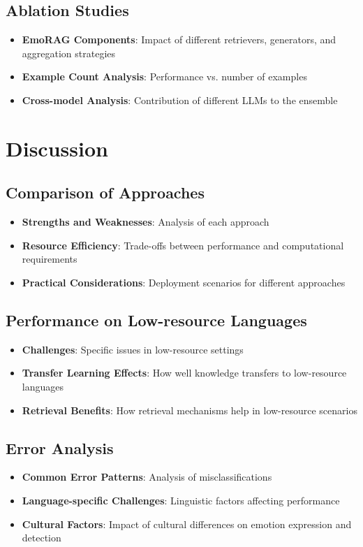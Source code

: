 \documentclass[a4paper,12pt]{extarticle}
\begin{document}
\subsection{Ablation Studies}
\begin{itemize}
\item \textbf{EmoRAG Components}: Impact of different retrievers, generators, and aggregation strategies
\item \textbf{Example Count Analysis}: Performance vs. number of examples
\item \textbf{Cross-model Analysis}: Contribution of different LLMs to the ensemble
\end{itemize}

\section{Discussion}

\subsection{Comparison of Approaches}
\begin{itemize}
\item \textbf{Strengths and Weaknesses}: Analysis of each approach
\item \textbf{Resource Efficiency}: Trade-offs between performance and computational requirements
\item \textbf{Practical Considerations}: Deployment scenarios for different approaches
\end{itemize}

\subsection{Performance on Low-resource Languages}
\begin{itemize}
\item \textbf{Challenges}: Specific issues in low-resource settings
\item \textbf{Transfer Learning Effects}: How well knowledge transfers to low-resource languages
\item \textbf{Retrieval Benefits}: How retrieval mechanisms help in low-resource scenarios
\end{itemize}

\subsection{Error Analysis}
\begin{itemize}
\item \textbf{Common Error Patterns}: Analysis of misclassifications
\item \textbf{Language-specific Challenges}: Linguistic factors affecting performance
\item \textbf{Cultural Factors}: Impact of cultural differences on emotion expression and detection
\end{itemize}
\end{document}
